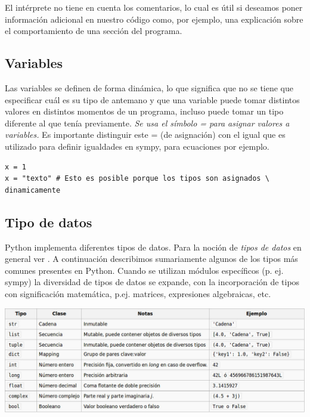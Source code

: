 El intérprete no tiene en cuenta los comentarios, lo cual es útil si deseamos poner información adicional en nuestro código como, por ejemplo, una explicación sobre el comportamiento de una sección del programa.








\subsection{Variables}
Las variables se definen de forma dinámica, lo que significa que no se tiene que especificar cuál es su tipo de antemano y que una variable puede tomar distintos valores en distintos momentos de un programa, incluso puede tomar
 un tipo diferente al que tenía previamente. \emph{Se usa el símbolo = para asignar valores a variables.}
\advertencia Es importante distinguir este = (de asignación) con el igual que es utilizado para definir igualdades en sympy, para ecuaciones por ejemplo.



\begin{lstlisting}
x = 1
x = "texto" # Esto es posible porque los tipos son asignados \
dinamicamente
\end{lstlisting}

\subsection{Tipo de datos}

Python implementa diferentes tipos de datos. Para la noción de \emph{tipos de datos} en 
general 
ver \cite{wiki:tipo_dato}\link. A continuación describimos sumariamente algunos de los tipos 
más comunes presentes en Python. Cuando se utilizan módulos específicos (p. ej. sympy) la 
diversidad  de tipos de datos se expande, con la incorporación de tipos con significación
matemática, p.ej. matrices,  expresiones algebraicas, etc. 


\includegraphics[scale=.4]{imagenes/tipo_datos.jpg}

